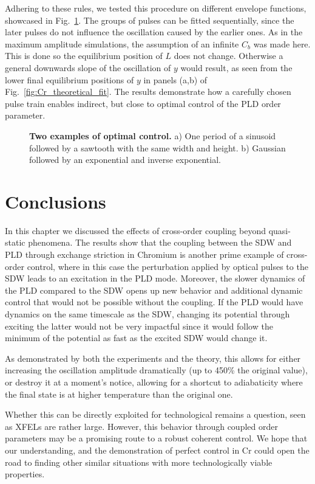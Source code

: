 Adhering to these rules, we tested this procedure on different envelope functions, showcased in Fig.~\ref{fig:Cr_control}.
The groups of pulses can be fitted sequentially, since the later pulses do not influence the oscillation caused by the earlier ones.
As in the maximum amplitude simulations, the assumption of an infinite $C_b$ was made here.
This is done so the equilibrium position of $L$ does not change.
Otherwise a general downwards slope of the oscillation of $y$ would result, as seen from the lower final equilibrium positions of $y$ in panels (a,b) of Fig.~\ref{fig:Cr_theoretical_fit}.
The results demonstrate how a carefully chosen pulse train enables indirect, but close to optimal control of the PLD order parameter.
\begin{figure}
	\caption{\label{fig:Cr_control} {\bf Two examples of optimal control.} a) One period of a sinusoid followed by a sawtooth with the same width and height. b) Gaussian followed by an exponential and inverse exponential.}
\end{figure}

\section{Conclusions}
In this chapter we discussed the effects of cross-order coupling beyond quasi-static phenomena.
The results show that the coupling between the SDW and PLD through exchange striction in Chromium is another prime example of cross-order control, where in this case the perturbation applied by optical pulses to the SDW leads to an excitation in the PLD mode.
Moreover, the slower dynamics of the PLD compared to the SDW opens up new behavior and additional dynamic control that would not be possible without the coupling.
If the PLD would have dynamics on the same timescale as the SDW, changing its potential through exciting the latter would not be very impactful since it would follow the minimum of the potential as fast as the excited SDW would change it.

As demonstrated by both the experiments and the theory, this allows for either increasing the oscillation amplitude dramatically (up to 450\% the original value), or destroy it at a moment's notice, allowing for a shortcut to adiabaticity where the final state is at higher temperature than the original one.

Whether this can be directly exploited for technological remains a question, seen as XFELs are rather large.
However, this behavior through coupled order parameters may be a promising route to a robust coherent control.
We hope that our understanding, and the demonstration of perfect control in Cr could open the road to finding other similar situations with more technologically viable properties.   
